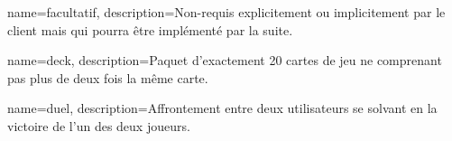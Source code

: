 {
    name={facultatif},
    description={Non-requis explicitement ou implicitement par le client mais qui pourra être implémenté par la suite.}
}

{
    name={deck},
    description={Paquet d'exactement 20 cartes de jeu ne comprenant pas plus de deux fois la même carte.}
}

{
    name={duel},
    description={Affrontement entre deux utilisateurs se solvant en la victoire de l'un des deux joueurs.}
}
